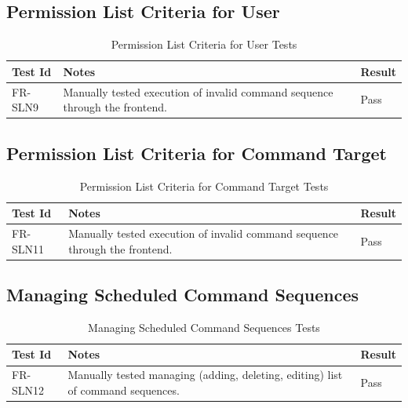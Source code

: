 \documentclass[12pt, titlepage]{article}
\begin{document}
\subsection{Permission List Criteria for User}

\begin{center}
\begin{longtable}{|p{2cm} | p{8cm} |p{2cm}| }
\caption{Permission List Criteria for User Tests}
\hline
\textbf{Test Id} & \textbf{Notes} & \textbf{Result} \\
\hline
FR-SLN9 & Manually tested execution of invalid command sequence through the frontend. & Pass \\
\hline

\end{longtable}
\end{center}

\subsection{Permission List Criteria for Command Target}

\begin{center}
\begin{longtable}{|p{2cm} | p{8cm} |p{2cm}| }
\caption{Permission List Criteria for Command Target Tests}
\hline
\textbf{Test Id} & \textbf{Notes} & \textbf{Result} \\
\hline
FR-SLN11 & Manually tested execution of invalid command sequence through the frontend. & Pass \\
\hline

\end{longtable}
\end{center}

\subsection{Managing Scheduled Command Sequences}

\begin{center}
\begin{longtable}{|p{2cm} | p{8cm} |p{2cm}| }
\caption{Managing Scheduled Command Sequences Tests}
\hline
\textbf{Test Id} & \textbf{Notes} & \textbf{Result} \\
\hline
FR-SLN12 & Manually tested managing (adding, deleting, editing) list of command sequences. & Pass \\
\hline

\end{longtable}
\end{center}
\end{document}
